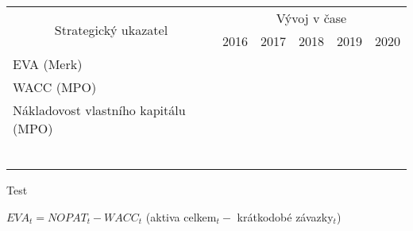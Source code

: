 \begin{table}[!htbp]
\begin{tabular}{llllll}
\hline
\multicolumn{1}{|c|}{\multirow{2}{*}{Strategický ukazatel}} & \multicolumn{5}{c|}{Vývoj v čase} \\ \cline{2-6} 
\multicolumn{1}{|c|}{} & \multicolumn{1}{c|}{2016} & \multicolumn{1}{c|}{2017} & \multicolumn{1}{c|}{2018} & \multicolumn{1}{c|}{2019} & \multicolumn{1}{c|}{2020} \\ \hline
\multicolumn{1}{|l|}{EVA (Merk)} & \multicolumn{1}{l|}{} & \multicolumn{1}{l|}{} & \multicolumn{1}{l|}{} & \multicolumn{1}{l|}{} & \multicolumn{1}{l|}{} \\ \hline
\multicolumn{1}{|l|}{WACC (MPO)} & \multicolumn{1}{l|}{} & \multicolumn{1}{l|}{} & \multicolumn{1}{l|}{} & \multicolumn{1}{l|}{} & \multicolumn{1}{l|}{} \\ \hline
\multicolumn{1}{|l|}{Nákladovost vlastního kapitálu (MPO)} & \multicolumn{1}{l|}{} & \multicolumn{1}{l|}{} & \multicolumn{1}{l|}{} & \multicolumn{1}{l|}{} & \multicolumn{1}{l|}{} \\ \hline
 &  &  &  &  &  \\
 &  &  &  &  &  \\
 &  &  &  &  &  \\
 &  &  &  &  &  \\
 &  &  &  &  &  \\
 &  &  &  &  & 
\end{tabular}
\end{table}

Test 

$EVA_t = NOPAT_t - WACC_t$ (aktiva celkem$_t -$ krátkodobé závazky$_t$)


